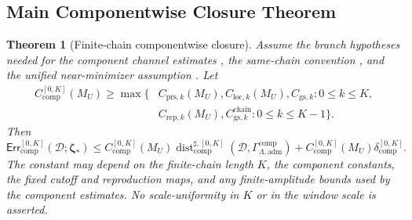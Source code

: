 \documentclass[11pt]{article}
\numberwithin{equation}{section}
\newtheorem{theorem}{Theorem}[section]
\theoremstyle{definition}
\theoremstyle{remark}
\newcommand{\adm}{\mathrm{adm}}
\newcommand{\prs}{\mathrm{prs}}
\newcommand{\rep}{\mathrm{rep}}
\newcommand{\gs}{\mathrm{gs}}
\newcommand{\locerr}{\mathrm{loc}}
\newcommand{\comp}{\mathrm{comp}}
\newcommand{\chain}{\mathrm{chain}}
\newcommand{\Err}{\mathsf{Err}}
\newcommand{\Dist}{\operatorname{dist}}
\newcommand{\calD}{\mathcal D}
\newcommand{\bzeta}{\boldsymbol\zeta}
\newcommand{\Gcomp}{\Gamma_{\Lambda,\adm}^{\comp}}
\begin{document}
\subsection{Main Componentwise Closure Theorem}
\label{comp:sec:main-target}

\begin{theorem}[Finite-chain componentwise closure]
\label{comp:thm:componentwise-closure-target}
Assume the branch hypotheses needed for the component channel estimates
, the same-chain convention
, and the unified near-minimizer
assumption .  Let
\[
\begin{aligned}
    C_{\comp}^{[0,K]}(M_U)
    \ge
    \max\bigl\{&
    C_{{\prs},k}(M_U),
    C_{{\locerr},k}(M_U),
    C_{{\gs},k}:0\le k\le K,\\
    &C_{{\rep},k}(M_U),
    C_{{\gs},k}^{\chain}:0\le k\le K-1
    \bigr\}.
\end{aligned}
\]
Then
\[
    \Err_{\comp}^{[0,K]}(\calD;\bzeta_*)
    \le
    C_{\comp}^{[0,K]}(M_U)
    \Dist_{\comp}^{\sharp,[0,K]}(\calD,\Gcomp)
    +
    C_{\comp}^{[0,K]}(M_U)
    \delta_{\comp}^{[0,K]}.
\]
The constant may depend on the finite-chain length \(K\), the component
constants, the fixed cutoff and reproduction maps, and any finite-amplitude
bounds used by the component estimates.  No scale-uniformity in \(K\) or in the
window scale is asserted.
\end{theorem}
\end{document}
